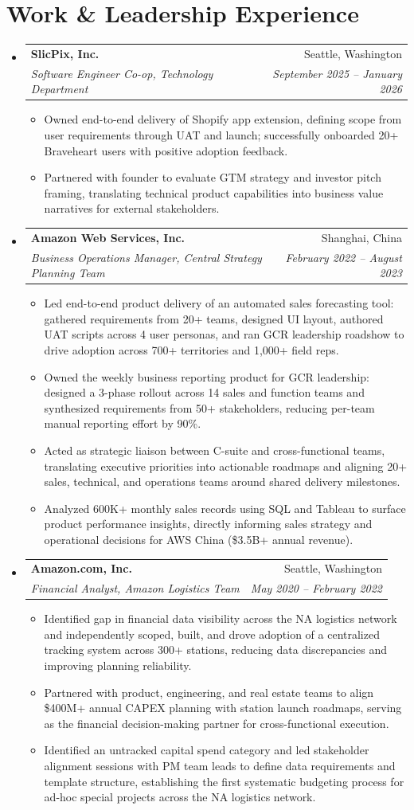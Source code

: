 \documentclass[letterpaper,10pt]{article}
\makeatletter
\newcommand{\resumeItem}[1]{\item\small{{#1\vspace{-2pt}}}}
\newcommand{\resumeSubheading}[4]{
  \vspace{-2pt}\item
  \begin{tabular*}{0.97\textwidth}[t]{l@{\extracolsep{\fill}}r}
    \textbf{#1} & #2 \\
    \textit{\small#3} & \textit{\small #4} \\
  \end{tabular*}\vspace{-9pt}}
\newcommand{\resumeSubHeadingListStart}{\begin{itemize}[leftmargin=0.15in,label={}]}
\newcommand{\resumeSubHeadingListEnd}{\end{itemize}}
\newcommand{\resumeItemListStart}{\begin{itemize}}
\newcommand{\resumeItemListEnd}{\end{itemize}\vspace{-7pt}}
\makeatother
\begin{document}
\vspace{-12pt}

\section{Work \& Leadership Experience}
\resumeSubHeadingListStart
  \resumeSubheading{SlicPix, Inc.}{Seattle, Washington}{Software Engineer Co-op, Technology Department}{September 2025 -- January 2026}
  \resumeItemListStart
    \resumeItem{Owned end-to-end delivery of Shopify app extension, defining scope from user requirements through UAT and launch; successfully onboarded 20+ Braveheart users with positive adoption feedback.}
    \resumeItem{Partnered with founder to evaluate GTM strategy and investor pitch framing, translating technical product capabilities into business value narratives for external stakeholders.}
  \resumeItemListEnd

  \resumeSubheading{Amazon Web Services, Inc.}{Shanghai, China}{Business Operations Manager, Central Strategy Planning Team}{February 2022 -- August 2023}
  \resumeItemListStart
    \resumeItem{Led end-to-end product delivery of an automated sales forecasting tool: gathered requirements from 20+ teams, designed UI layout, authored UAT scripts across 4 user personas, and ran GCR leadership roadshow to drive adoption across 700+ territories and 1,000+ field reps.}
    \resumeItem{Owned the weekly business reporting product for GCR leadership: designed a 3-phase rollout across 14 sales and function teams and synthesized requirements from 50+ stakeholders, reducing per-team manual reporting effort by 90\%.}
    \resumeItem{Acted as strategic liaison between C-suite and cross-functional teams, translating executive priorities into actionable roadmaps and aligning 20+ sales, technical, and operations teams around shared delivery milestones.}
    \resumeItem{Analyzed 600K+ monthly sales records using SQL and Tableau to surface product performance insights, directly informing sales strategy and operational decisions for AWS China (\$3.5B+ annual revenue).}
  \resumeItemListEnd

  \resumeSubheading{Amazon.com, Inc.}{Seattle, Washington}{Financial Analyst, Amazon Logistics Team}{May 2020 -- February 2022}
  \resumeItemListStart
    \resumeItem{Identified gap in financial data visibility across the NA logistics network and independently scoped, built, and drove adoption of a centralized tracking system across 300+ stations, reducing data discrepancies and improving planning reliability.}
    \resumeItem{Partnered with product, engineering, and real estate teams to align \$400M+ annual CAPEX planning with station launch roadmaps, serving as the financial decision-making partner for cross-functional execution.}
    \resumeItem{Identified an untracked capital spend category and led stakeholder alignment sessions with PM team leads to define data requirements and template structure, establishing the first systematic budgeting process for ad-hoc special projects across the NA logistics network.}
  \resumeItemListEnd
\resumeSubHeadingListEnd
\end{document}
